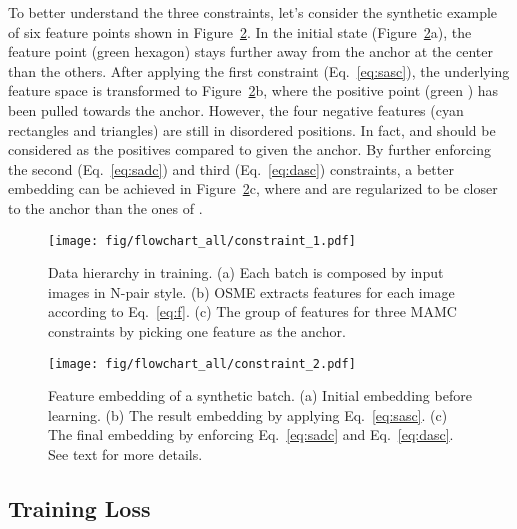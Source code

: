 \documentclass[runningheads]{llncs}
\begin{document}
To better understand the three constraints, let's consider the synthetic example of six feature points shown in Figure~\ref{fig:flowchart_constraint_b}.
In the initial state (Figure~\ref{fig:flowchart_constraint_b}a), the  feature point (green hexagon) stays further away from the anchor  at the center than the others.
After applying the first constraint (Eq.~\ref{eq:sasc}), the underlying feature space is transformed to Figure~\ref{fig:flowchart_constraint_b}b, where the  positive point (green \checkmark) has been pulled towards the anchor.
However, the four negative features (cyan rectangles and triangles) are still in disordered positions.
In fact,  and  should be considered as the positives compared to  given the anchor.
By further enforcing the second (Eq.~\ref{eq:sadc}) and third (Eq.~\ref{eq:dasc}) constraints, a better embedding can be achieved in Figure~\ref{fig:flowchart_constraint_b}c, where  and  are regularized to be closer to the anchor than the ones of .


\begin{figure}[t]
  \centering
    \vspace{-.1in}
  \texttt{[image: fig/flowchart\_all/constraint\_1.pdf]}
  \vspace{-.1in}
  \caption{Data hierarchy in training. (a) Each batch is composed by  input images in N-pair style. (b) OSME extracts  features for each image according to Eq.~\ref{eq:f}. (c) The group of features for three MAMC constraints by picking one feature  as the anchor.}
  \label{fig:flowchart_constraint_a}
\end{figure}

\begin{figure}[t]
  \centering
    \vspace{-.1in}
  \texttt{[image: fig/flowchart\_all/constraint\_2.pdf]}
  \caption{Feature embedding of a synthetic batch. (a) Initial embedding before learning. (b) The result embedding by applying Eq.~\ref{eq:sasc}. (c) The final embedding by enforcing Eq.~\ref{eq:sadc} and Eq.~\ref{eq:dasc}. See text for more details.}
  \label{fig:flowchart_constraint_b}
\end{figure}

\vspace{-.1in}
\subsection{Training Loss}
\end{document}
